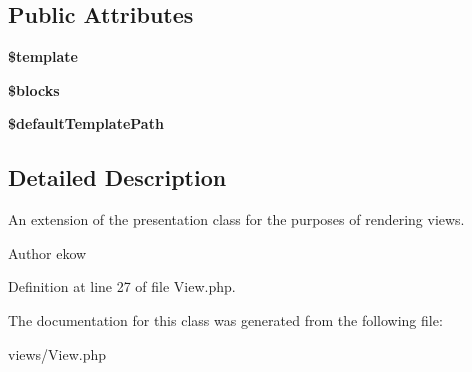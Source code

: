 \subsection*{Public Attributes}
\begin{DoxyCompactItemize}
\item 
\hypertarget{class_view_a4833469062d3f9086f204d4be985e9bc}{
{\bfseries \$template}}
\label{class_view_a4833469062d3f9086f204d4be985e9bc}

\item 
\hypertarget{class_view_aedf5a565842dd7124ca0cbd6765ec616}{
{\bfseries \$blocks}}
\label{class_view_aedf5a565842dd7124ca0cbd6765ec616}

\item 
\hypertarget{class_view_a16908fe9962ecfeb6fd7568ea5aaa9a5}{
{\bfseries \$defaultTemplatePath}}
\label{class_view_a16908fe9962ecfeb6fd7568ea5aaa9a5}

\end{DoxyCompactItemize}


\subsection{Detailed Description}
An extension of the presentation class for the purposes of rendering views. \begin{DoxyAuthor}{Author}
ekow 
\end{DoxyAuthor}


Definition at line 27 of file View.php.



The documentation for this class was generated from the following file:\begin{DoxyCompactItemize}
\item 
views/View.php\end{DoxyCompactItemize}
